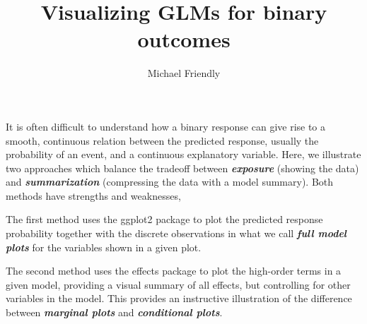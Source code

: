 \documentclass{article}
\newcommand{\pkg}[1]{\textsf{#1}\nocite{R-#1}}
\newcommand{\Rpackage}[1]{\pkg{#1} package}
\newcommand{\term}[1]{\textit{\textbf{#1}}}
\begin{document}


\title{Visualizing GLMs for binary outcomes}
\author{Michael Friendly}
\maketitle




It is often difficult to understand how a binary response can give rise to
a smooth, continuous relation between the predicted response, usually
the probability of an event, and a continuous explanatory variable.
Here, we illustrate two approaches which balance the tradeoff between
\term{exposure} (showing the data) and \term{summarization} (compressing the data with a model summary). Both methods have strengths and weaknesses,

\begin{itemize*}
  \item The first method uses the \Rpackage{ggplot2} to plot the predicted
response probability together with the discrete observations in what
we call \term{full model plots} for the variables shown in a
given plot.
  \item The second method uses the \Rpackage{effects} to plot the high-order
terms in a given model, providing a visual summary of all effects,
but controlling for other variables in the model.  This provides an
instructive illustration of the difference between \term{marginal plots} and
\term{conditional plots}.
\end{itemize*}

\end{document}
